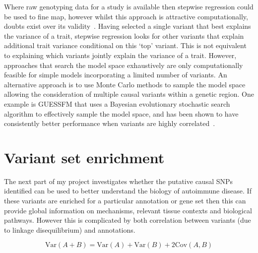 \documentclass[a4paper,11pt]{report}
\begin{document}
Where raw genotyping data for a study is available then stepwise regression could be used to fine map, however whilst this approach is attractive computationally, doubts exist over its validity~\citep{miller-1984}.  Having selected a single variant that best explains the variance of a trait, stepwise regression  looks for other variants that explain additional trait variance conditional on this `top' variant. This is not equivalent to explaining which variants jointly explain the variance of a trait. However, approaches that search the model space exhaustively are only computationally feasible for simple models incorporating a limited number of variants. An alternative approach is to use Monte Carlo methods to sample the model space allowing the consideration of multiple causal variants within a genetic region. One example is GUESSFM that uses a Bayesian evolutionary stochastic search algorithm to effectively sample the model space, and has been shown to have consistently better performance when variants are highly correlated~\cite{WallaceCutlerPontikosEtAl2015}. 

\section{Variant set enrichment}
\label{sect:vsea}
The next part of my project investigates whether the putative causal SNPs identified can be used to better understand the biology of autoimmune disease.  If these variants  are enriched for a particular annotation or gene set then this can provide global information on mechanisms, relevant tissue contexts and biological pathways. However this is complicated by both correlation between variants (due to linkage disequilibrium) and annotations. 

\begin{equation}
	\text{Var}(A + B) = \text{Var}(A) + \text{Var}(B) + 2\text{Cov}(A,B)
\end{equation}
\end{document}
